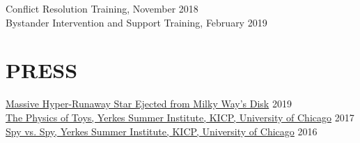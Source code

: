 \documentclass[margin]{res}
\begin{document}
\begin{resume}
Conflict Resolution Training, November 2018\\
Bystander Intervention and Support Training, February 2019

\section{PRESS}

\href{https://news.umich.edu/u-m-researchers-confirm-massive-hyper-runaway-star-ejected-from-the-milky-way-disk/}{Massive Hyper-Runaway Star Ejected from Milky Way's Disk} \hfill 2019\\
\href{http://kicp.uchicago.edu/events/kicp_yerkes.html#id_959}{The Physics of Toys, Yerkes Summer Institute, KICP, University of Chicago} \hfill 2017\\
\href{http://kicp.uchicago.edu/events/kicp_yerkes.html#id_785}{Spy vs. Spy, Yerkes Summer Institute, KICP, University of Chicago} \hfill 2016\\












\end{resume}
\end{document}
